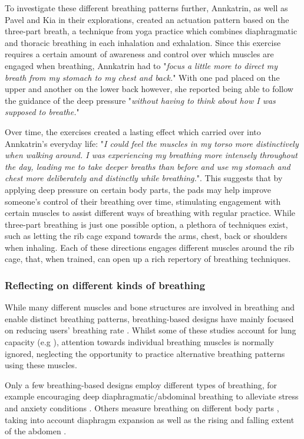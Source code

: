 To investigate these different breathing patterns further, Annkatrin, as well as Pavel and Kia in their explorations, created an actuation pattern based on the three-part breath, a technique from yoga practice which combines diaphragmatic and thoracic breathing in each inhalation and exhalation. Since this exercise requires a certain amount of awareness and control over which muscles are engaged when breathing, Annkatrin had to "\textit{focus a little more to direct my breath from my stomach to my chest and back.}" With one pad placed on the upper and another on the lower back however, she reported being able to follow the guidance of the deep pressure "\textit{without having to think about how I was supposed to breathe.}"

Over time, the exercises created a lasting effect which carried over into Annkatrin's everyday life: "\textit{I could feel the muscles in my torso more distinctively when walking around. I was experiencing my breathing more intensely throughout the day, leading me to take deeper breaths than before and use my stomach and chest more deliberately and distinctly while breathing.}". This suggests that by applying deep pressure on certain body parts, the pads may help improve someone's control of their breathing over time, stimulating engagement with certain muscles to assist different ways of breathing with regular practice. While three-part breathing is just one possible option, a plethora of techniques exist, such as letting the rib cage expand towards the arms, chest, back or shoulders when inhaling. Each of these directions engages different muscles around the rib cage, that, when trained, can open up a rich repertory of breathing techniques. 
% 

\subsubsection{Reflecting on different kinds of breathing}

While many different muscles and bone structures are involved in breathing and enable distinct breathing patterns, breathing-based designs have mainly focused on reducing users' breathing rate \cite{prpa_inhaling_2020}. Whilst some of these studies account for lung capacity (e.g \cite{abushakra_augmenting_2014}), attention towards individual breathing muscles is normally ignored, neglecting the opportunity to practice alternative breathing patterns using these muscles.

Only a few breathing-based designs employ different types of breathing, for example encouraging deep diaphragmatic/abdominal breathing to alleviate stress \cite{prpa_hacking_2016} and anxiety conditions \cite{van_rooij_deep_2016}. Others measure breathing on different body parts \cite{prpa_attending_2018}, taking into account diaphragm expansion \cite{desnoyers-stewart_jel_2019} as well as the rising and falling extent of the abdomen \cite{schnadelbach_exobuilding:_2012}. 


